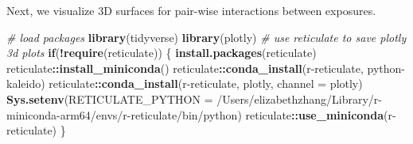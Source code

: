 \documentclass[12pt, twoside]{amherstthesis}
\newenvironment{Shaded}{\begin{snugshade}}{\end{snugshade}}
\newcommand{\AttributeTok}[1]{\textcolor[rgb]{0.13,0.29,0.53}{#1}}
\newcommand{\CommentTok}[1]{\textcolor[rgb]{0.56,0.35,0.01}{\textit{#1}}}
\newcommand{\ControlFlowTok}[1]{\textcolor[rgb]{0.13,0.29,0.53}{\textbf{#1}}}
\newcommand{\FunctionTok}[1]{\textcolor[rgb]{0.13,0.29,0.53}{\textbf{#1}}}
\newcommand{\NormalTok}[1]{#1}
\newcommand{\SpecialCharTok}[1]{\textcolor[rgb]{0.81,0.36,0.00}{\textbf{#1}}}
\newcommand{\StringTok}[1]{\textcolor[rgb]{0.31,0.60,0.02}{#1}}
\begin{document}
\normalsize

Next, we visualize 3D surfaces for pair-wise interactions between exposures.

\scriptsize
\begin{Shaded}
\begin{Highlighting}[]
\CommentTok{\# load packages}
\FunctionTok{library}\NormalTok{(tidyverse)}
\FunctionTok{library}\NormalTok{(plotly)}
\CommentTok{\# use reticulate to save plotly 3d plots}
\ControlFlowTok{if}\NormalTok{(}\SpecialCharTok{!}\FunctionTok{require}\NormalTok{(reticulate)) \{}
  \FunctionTok{install.packages}\NormalTok{(}\StringTok{\textquotesingle{}reticulate\textquotesingle{}}\NormalTok{)}
\NormalTok{  reticulate}\SpecialCharTok{::}\FunctionTok{install\_miniconda}\NormalTok{()}
\NormalTok{  reticulate}\SpecialCharTok{::}\FunctionTok{conda\_install}\NormalTok{(}\StringTok{\textquotesingle{}r{-}reticulate\textquotesingle{}}\NormalTok{, }\StringTok{\textquotesingle{}python{-}kaleido\textquotesingle{}}\NormalTok{)}
\NormalTok{  reticulate}\SpecialCharTok{::}\FunctionTok{conda\_install}\NormalTok{(}\StringTok{\textquotesingle{}r{-}reticulate\textquotesingle{}}\NormalTok{, }\StringTok{\textquotesingle{}plotly\textquotesingle{}}\NormalTok{, }\AttributeTok{channel =} \StringTok{\textquotesingle{}plotly\textquotesingle{}}\NormalTok{)}
  \FunctionTok{Sys.setenv}\NormalTok{(}\AttributeTok{RETICULATE\_PYTHON =} 
               \StringTok{\textquotesingle{}/Users/elizabethzhang/Library/r{-}miniconda{-}arm64/envs/r{-}reticulate/bin/python\textquotesingle{}}\NormalTok{)}
\NormalTok{  reticulate}\SpecialCharTok{::}\FunctionTok{use\_miniconda}\NormalTok{(}\StringTok{\textquotesingle{}r{-}reticulate\textquotesingle{}}\NormalTok{)}
\NormalTok{\}}
\end{Highlighting}
\end{Shaded}
\normalsize
\end{document}
